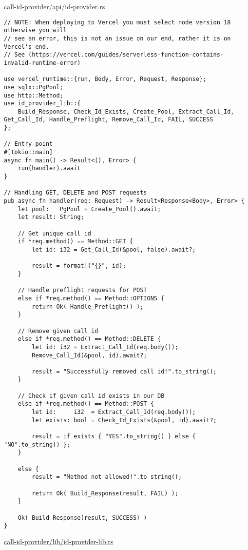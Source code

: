 \underline{call-id-provider/api/id-provider.rs}

\begin{verbatim}
// NOTE: When deploying to Vercel you must select node version 18 otherwise you will
// see an error, this is not an issue on our end, rather it is on Vercel's end.
// See (https://vercel.com/guides/serverless-function-contains-invalid-runtime-error)

use vercel_runtime::{run, Body, Error, Request, Response};
use sqlx::PgPool;
use http::Method;
use id_provider_lib::{
    Build_Response, Check_Id_Exists, Create_Pool, Extract_Call_Id, Get_Call_Id, Handle_Preflight, Remove_Call_Id, FAIL, SUCCESS
};

// Entry point
#[tokio::main]
async fn main() -> Result<(), Error> {
    run(handler).await
}

// Handling GET, DELETE and POST requests
pub async fn handler(req: Request) -> Result<Response<Body>, Error> {
    let pool:   PgPool = Create_Pool().await;
    let result: String;

    // Get unique call id
    if *req.method() == Method::GET {
        let id: i32 = Get_Call_Id(&pool, false).await?;

        result = format!("{}", id);
    }

    // Handle preflight requests for POST
    else if *req.method() == Method::OPTIONS {
        return Ok( Handle_Preflight() );
    }

    // Remove given call id
    else if *req.method() == Method::DELETE {
        let id: i32 = Extract_Call_Id(req.body());
        Remove_Call_Id(&pool, id).await?;

        result = "Successfully removed call id!".to_string();
    }

    // Check if given call id exists in our DB
    else if *req.method() == Method::POST {
        let id:     i32  = Extract_Call_Id(req.body());
        let exists: bool = Check_Id_Exists(&pool, id).await?;

        result = if exists { "YES".to_string() } else { "NO".to_string() };
    }

    else {
        result = "Method not allowed!".to_string();

        return Ok( Build_Response(result, FAIL) );
    }

    Ok( Build_Response(result, SUCCESS) )
}
\end{verbatim}

\underline{call-id-provider/lib/id-provider-lib.rs}

